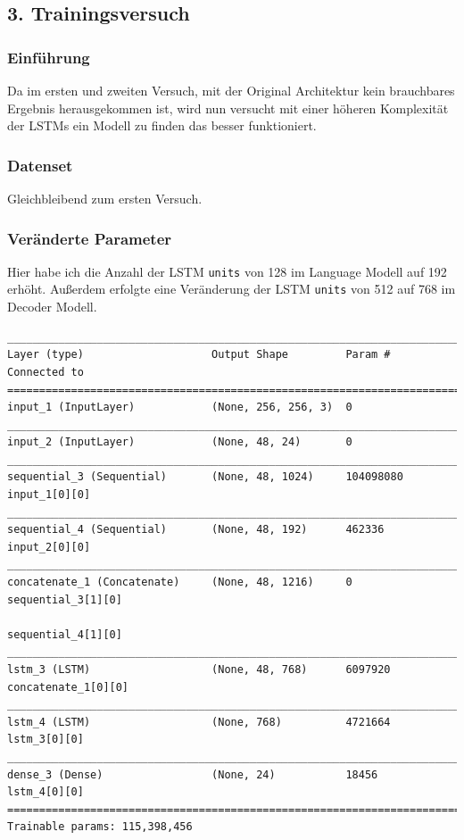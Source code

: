 \documentclass[pdftex,a4paper,halfparskip, article]{scrartcl}
\begin{document}
\subsection{3. Trainingsversuch}


\subsubsection*{Einführung}

Da im ersten und zweiten Versuch, mit der Original Architektur kein brauchbares Ergebnis herausgekommen ist, wird nun versucht mit einer höheren Komplexität der LSTMs ein Modell zu finden das besser funktioniert.

\subsubsection*{Datenset}

Gleichbleibend zum ersten Versuch.

\subsubsection*{Veränderte Parameter}

Hier habe ich die Anzahl der LSTM \texttt{units} von 128 im Language Modell auf 192 erhöht. Außerdem erfolgte eine Veränderung der LSTM \texttt{units} von 512 auf 768 im Decoder Modell.

\begin{verbatim}
_____________________________________________________________________________
Layer (type)                    Output Shape         Param #     Connected to
=============================================================================
input_1 (InputLayer)            (None, 256, 256, 3)  0
_____________________________________________________________________________
input_2 (InputLayer)            (None, 48, 24)       0
_____________________________________________________________________________
sequential_3 (Sequential)       (None, 48, 1024)     104098080   input_1[0][0]
_____________________________________________________________________________
sequential_4 (Sequential)       (None, 48, 192)      462336      input_2[0][0]
_____________________________________________________________________________
concatenate_1 (Concatenate)     (None, 48, 1216)     0           sequential_3[1][0]
                                                                 sequential_4[1][0]
_____________________________________________________________________________
lstm_3 (LSTM)                   (None, 48, 768)      6097920     concatenate_1[0][0]
_____________________________________________________________________________
lstm_4 (LSTM)                   (None, 768)          4721664     lstm_3[0][0]
_____________________________________________________________________________
dense_3 (Dense)                 (None, 24)           18456       lstm_4[0][0]
=============================================================================
Trainable params: 115,398,456

\end{verbatim}
\end{document}
